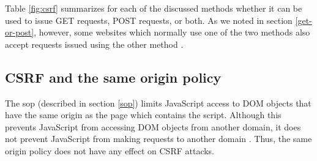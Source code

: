 Table \ref{fig:csrf} summarizes for each of the discussed methods whether it can be used to issue GET requests, POST requests, or both. As we noted in section \ref{get-or-post}, however, some websites which normally use one of the two methods also accept requests issued using the other method \cite{Zeller2008}.

\subsection{CSRF and the same origin policy}

The \gls{sop} (described in section \ref{sop}) limits JavaScript access to DOM objects that have the same origin as the page which contains the script. Although this prevents JavaScript from accessing DOM objects from another domain, it does not prevent JavaScript from making requests to another domain \cite{DeRyck2010}. Thus, the same origin policy does not have any effect on CSRF attacks.
